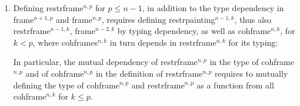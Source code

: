 \documentclass[a4paper,english,cleveref,autoref,thm-restate]{article}
\begin{document}
\begin{enumerate}
\item Defining restrframe$^{n,p}$ for $p\leq n-1$, in addition to the
  type dependency in frame$^{n+1,p}$ and frame$^{n,p}$, requires
  defining restrpainting$^{n-1,k}$, thus also restrframe$^{n-1,k}$,
  frame$^{n-2,k}$ by typing dependency, as well as cohframe$^{n,k}$,
  for $k < p$, where cohframes$^{n,k}$ in turn depends in
  restrframe$^{n,k}$ for its typing:
\begin{center}
\end{center}

In particular, the mutual dependency of restrframe$^{n,p}$ in the type
of cohframe$^{n,p}$ and of cohframe$^{n,p}$ in the definition of
restrframe$^{n,p}$ requires to mutually defining the type of
cohframe$^{n,p}$ and restrframe$^{n,p}$ as a function from all
cohframe$^{n,k}$ for $k\leq p$.


\end{enumerate}
\end{document}
